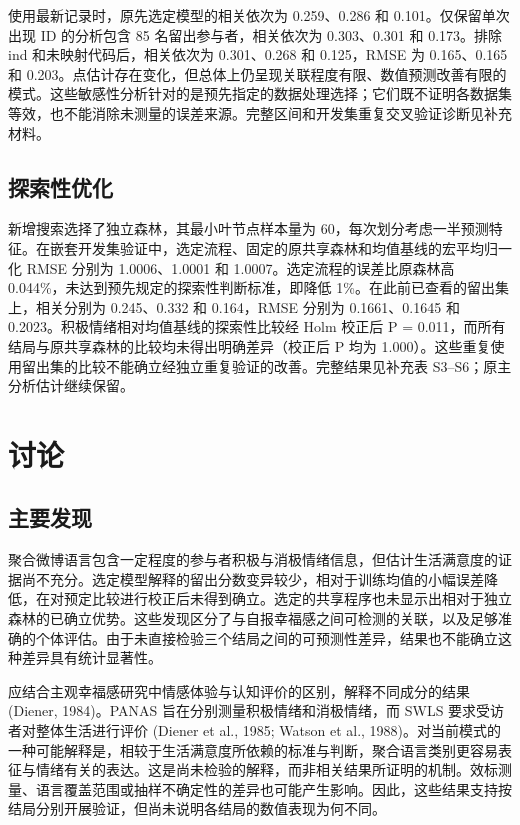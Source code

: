 \documentclass[11pt,letterpaper]{article}
\begin{document}
使用最新记录时，原先选定模型的相关依次为 0.259、0.286 和 0.101。仅保留单次出现 ID 的分析包含 85 名留出参与者，相关依次为 0.303、0.301 和 0.173。排除 ind 和未映射代码后，相关依次为 0.301、0.268 和 0.125，RMSE 为 0.165、0.165 和 0.203。点估计存在变化，但总体上仍呈现关联程度有限、数值预测改善有限的模式。这些敏感性分析针对的是预先指定的数据处理选择；它们既不证明各数据集等效，也不能消除未测量的误差来源。完整区间和开发集重复交叉验证诊断见补充材料。

\subsection{探索性优化}\label{ux63a2ux7d22ux6027ux4f18ux5316}

新增搜索选择了独立森林，其最小叶节点样本量为 60，每次划分考虑一半预测特征。在嵌套开发集验证中，选定流程、固定的原共享森林和均值基线的宏平均归一化 RMSE 分别为 1.0006、1.0001 和 1.0007。选定流程的误差比原森林高 0.044\%，未达到预先规定的探索性判断标准，即降低 1\%。在此前已查看的留出集上，相关分别为 0.245、0.332 和 0.164，RMSE 分别为 0.1661、0.1645 和 0.2023。积极情绪相对均值基线的探索性比较经 Holm 校正后 P = 0.011，而所有结局与原共享森林的比较均未得出明确差异（校正后 P 均为 1.000）。这些重复使用留出集的比较不能确立经独立重复验证的改善。完整结果见补充表 S3--S6；原主分析估计继续保留。

\FloatBarrier

\section{讨论}\label{ux8ba8ux8bba}

\subsection{主要发现}\label{ux4e3bux8981ux53d1ux73b0}

聚合微博语言包含一定程度的参与者积极与消极情绪信息，但估计生活满意度的证据尚不充分。选定模型解释的留出分数变异较少，相对于训练均值的小幅误差降低，在对预定比较进行校正后未得到确立。选定的共享程序也未显示出相对于独立森林的已确立优势。这些发现区分了与自报幸福感之间可检测的关联，以及足够准确的个体评估。由于未直接检验三个结局之间的可预测性差异，结果也不能确立这种差异具有统计显著性。

应结合主观幸福感研究中情感体验与认知评价的区别，解释不同成分的结果 (Diener, 1984)。PANAS 旨在分别测量积极情绪和消极情绪，而 SWLS 要求受访者对整体生活进行评价 (Diener et al., 1985; Watson et al., 1988)。对当前模式的一种可能解释是，相较于生活满意度所依赖的标准与判断，聚合语言类别更容易表征与情绪有关的表达。这是尚未检验的解释，而非相关结果所证明的机制。效标测量、语言覆盖范围或抽样不确定性的差异也可能产生影响。因此，这些结果支持按结局分别开展验证，但尚未说明各结局的数值表现为何不同。
\end{document}
